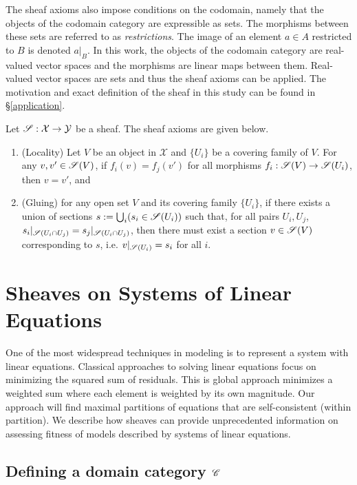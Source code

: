 \documentclass{article}
\begin{document}
The sheaf axioms also impose conditions on the codomain, namely that the
objects of the codomain category are expressible as sets. The morphisms between
these sets are referred to as \emph{restrictions}. The image of an element $a
\in A$ restricted to $B$ is denoted $a |_{B}$. In this work, the objects of the
codomain category are real-valued vector spaces and the morphisms are linear
maps between them.  Real-valued vector spaces are sets and thus the sheaf
axioms can be applied. The motivation and exact definition of the sheaf in this
study can be found in \S\ref{application}.

Let $\mathscr{S}: \mathcal{X} \rightarrow \mathcal{Y}$ be a sheaf. The sheaf axioms
are given below.
\begin{enumerate}

	\item (Locality) Let $V$ be an object in $\mathcal{X}$ and $\{U_i\}$ be
	a covering family of $V$. For any $v,v' \in \mathscr{S}(V)$, if $ f_i (v) = f_j
	(v') $ for all morphisms $f_i : \mathscr{S}(V) \rightarrow \mathscr{S}(U_i) $, then $v
	= v'$, and

	\item (Gluing) for any open set $V$ and its covering family $\{U_i\}$,
	if there exists a union of sections $s := \bigcup_{i} (s_i \in
	\mathscr{S}(U_i))$ such that, for all pairs $U_i, U_j$, $s_i |_{\mathscr{S}(U_i \cap
	U_j)} = s_j|_{\mathscr{S}(U_i \cap U_j)}$, then there must exist a section $v
	\in \mathscr{S}(V)$ corresponding to $s$, i.e. $v|_{\mathscr{S}(U_i)} = s_i$ for all
	$i$.

\end{enumerate}


\section{Sheaves on Systems of Linear Equations}

One of the most widespread techniques in modeling is to represent a system with
linear equations. Classical approaches to solving linear equations focus on
minimizing the squared sum of residuals. This is global approach minimizes a
weighted sum where each element is weighted by its own magnitude. Our approach
will find maximal partitions of equations that are self-consistent (within
partition). We describe how sheaves can provide unprecedented information on
assessing fitness of models described by systems of linear equations.


\subsection{Defining a domain category $\mathscr{C}$}
\label{domainCategory}
\end{document}
